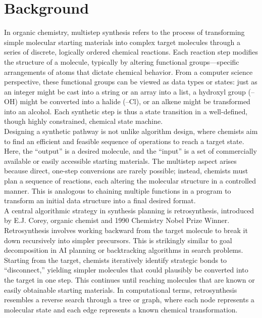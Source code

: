 \documentclass[12pt]{article}
\begin{document}
\section{Background}
\indent
In organic chemistry, multistep synthesis refers to the process of transforming simple molecular starting materials into complex target molecules through a series of discrete, logically ordered chemical reactions.
Each reaction step modifies the structure of a molecule, typically by altering functional groups—specific arrangements of atoms that dictate chemical behavior.
From a computer science perspective, these functional groups can be viewed as data types or states: just as an integer might be cast into a string or an array into a list, a hydroxyl group (–OH) might be converted into a halide (–Cl), or an alkene might be transformed into an alcohol. 
Each synthetic step is thus a state transition in a well-defined, though highly constrained, chemical state machine.
\\
\indent
Designing a synthetic pathway is not unlike algorithm design, where chemists aim to find an efficient and feasible sequence of operations to reach a target state.
Here, the “output” is a desired molecule, and the “input” is a set of commercially available or easily accessible starting materials. 
The multistep aspect arises because direct, one-step conversions are rarely possible; instead, chemists must plan a sequence of reactions, each altering the molecular structure in a controlled manner.
This is analogous to chaining multiple functions in a program to transform an initial data structure into a final desired format.
\\
\indent
A central algorithmic strategy in synthesis planning is retrosynthesis, introduced by E.J. Corey, organic chemist and 1990 Chemistry Nobel Prize Winner.
Retrosynthesis involves working backward from the target molecule to break it down recursively into simpler precursors.
This is strikingly similar to goal decomposition in AI planning or backtracking algorithms in search problems.
Starting from the target, chemists iteratively identify strategic bonds to “disconnect,” yielding simpler molecules that could plausibly be converted into the target in one step.
This continues until reaching molecules that are known or easily obtainable starting materials.
In computational terms, retrosynthesis resembles a reverse search through a tree or graph, where each node represents a molecular state and each edge represents a known chemical transformation.
\\
\indent
\end{document}
